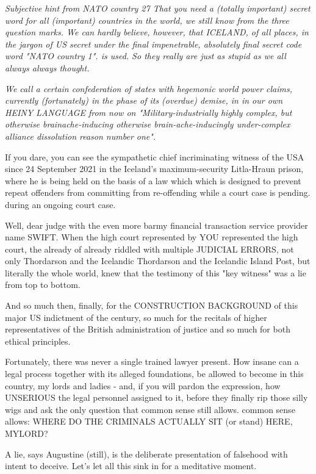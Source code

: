 \begin{multicols}{2}
\textit{Subjective hint from NATO country 27 
That you need a (totally important) secret word for all (important) countries in the world, we still know from
the three question marks. We can hardly believe, however,
that ICELAND, of all places, in the jargon of US secret
under the final impenetrable, absolutely final secret code word "NATO country 1".
is used. So they really are just as stupid as we all always
always thought.
}

\textit{
We call a certain confederation of states with hegemonic world power claims, currently (fortunately)
in the phase of its (overdue) demise, in
in our own HEINY LANGUAGE from now on
"Military-industrially highly complex, but otherwise brainache-inducing
otherwise brain-ache-inducingly under-complex alliance dissolution reason number one".
}

If you dare, you can see the sympathetic chief incriminating witness of the USA since 24 September 2021 in the
Iceland's maximum-security Litla-Hraun prison, where he is being held on the basis of a law which
which is designed to prevent repeat offenders from committing
from re-offending while a court case is pending.
during an ongoing court case.

Well, dear judge with the even more barmy financial transaction service provider name SWIFT. When the high court represented by
YOU represented the high court, the already of
already riddled with multiple JUDICIAL ERRORS, not only Thordarson and the Icelandic
Thordarson and the Icelandic Island Post, but literally the whole world, knew that the testimony of this "key witness" was a lie from top to bottom.

And so much then, finally, for the CONSTRUCTION BACKGROUND of this major US indictment of the century, so much for the recitals of higher representatives of the British administration of justice
and so much for both ethical principles.

Fortunately, there was never a single trained lawyer present. How insane can a legal process
together with its alleged foundations, be allowed to become in this country, my lords and ladies - and, if you will pardon the expression,
how UNSERIOUS the legal personnel assigned to it, before they finally rip those silly wigs
and ask the only question that common sense still allows.
common sense allows: WHERE DO THE CRIMINALS ACTUALLY SIT (or stand) HERE, MYLORD?

A lie, says Augustine (still), is the deliberate presentation of falsehood with intent to deceive. Let's let all this sink in for a meditative moment.



\end{multicols}
